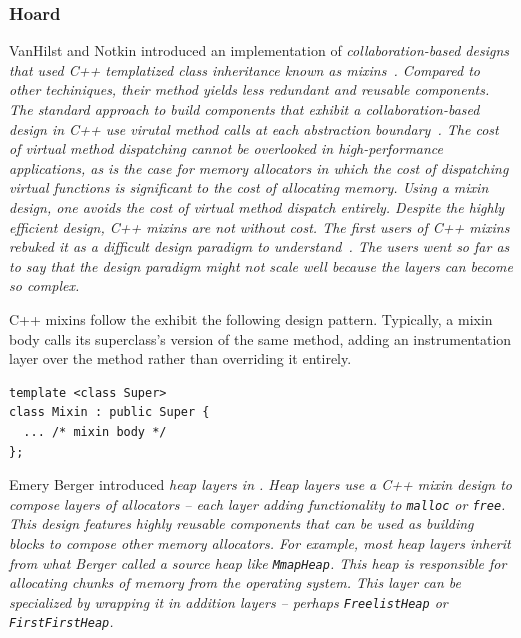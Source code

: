 \subsubsection{Hoard}
VanHilst and Notkin introduced an implementation of \em collaboration-based \em designs that used C++ templatized class inheritance known as \em mixins\em~\cite{Smaragdakis:2000:MPC:645417.652070}.  Compared to other techiniques, their method yields less redundant and reusable components.  The standard approach to build components that exhibit a collaboration-based design in C++ use virutal method calls at each abstraction boundary~\cite{Berger:2002:MMH:997313}.  The cost of virtual method dispatching cannot be overlooked in high-performance applications, as is the case for memory allocators in which the cost of dispatching virtual functions is significant to the cost of allocating memory.  Using a mixin design, one avoids the cost of virtual method dispatch entirely.  Despite the highly efficient design, C++ mixins are not without cost.  The first users of C++ mixins rebuked it as a difficult design paradigm to understand~\cite{Smaragdakis:2000:MPC:645417.652070}.  The users went so far as to say that the design paradigm might not scale well because the layers can become so complex.

C++ mixins follow the exhibit the following design pattern.  Typically, a mixin body calls its superclass's version of the same method, adding an instrumentation layer over the method rather than overriding it entirely.

\begin{verbatim}
template <class Super> 
class Mixin : public Super {
  ... /* mixin body */
};
\end{verbatim}

Emery Berger introduced \em heap layers \em in \cite{Berger:2002:MMH:997313}.  Heap layers use a C++ mixin design to compose layers of allocators -- each layer adding functionality to \verb,malloc, or \verb,free,.  This design features highly reusable components that can be used as building blocks to compose other memory allocators.  For example, most heap layers inherit from what Berger called a \em source heap \em like \verb,MmapHeap,.  This heap is responsible for allocating chunks of memory from the operating system.  This layer can be specialized by wrapping it in addition layers -- perhaps \verb,FreelistHeap, or \verb,FirstFirstHeap,.


